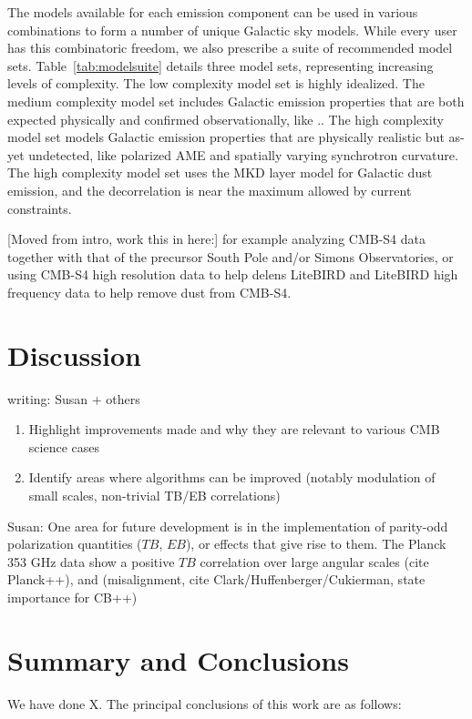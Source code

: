 \documentclass[twocolumn]{aastex631}
\begin{document}
The models available for each emission component can be used in various combinations to form a number of unique Galactic sky models. While every user has this combinatoric freedom, we also prescribe a suite of recommended model sets. Table~\ref{tab:modelsuite} details three model sets, representing increasing levels of complexity. The low complexity model set is highly idealized.
The medium complexity model set includes Galactic emission properties that are both expected physically and confirmed observationally, like ..
The high complexity model set models Galactic emission properties that are physically realistic but as-yet undetected, like polarized AME and spatially varying synchrotron curvature. The high complexity model set uses the MKD layer model for Galactic dust emission, and the decorrelation is near the maximum allowed by current constraints.

[Moved from intro, work this in here:]
for example analyzing CMB-S4 data together with that of the precursor South Pole and/or Simons Observatories, or using CMB-S4 high resolution data to help delens LiteBIRD and LiteBIRD high frequency data to help remove dust from CMB-S4.


\section{Discussion} \label{sec:discussion}
writing: Susan + others

\begin{enumerate}
    \item Highlight improvements made and why they are relevant to various CMB science cases
    \item Identify areas where algorithms can be improved (notably modulation of small scales, non-trivial TB/EB correlations)
\end{enumerate}

Susan:
One area for future development is in the implementation of parity-odd polarization quantities ($TB$, $EB$), or effects that give rise to them. The Planck 353 GHz data show a positive $TB$ correlation over large angular scales (cite Planck++), and (misalignment, cite Clark/Huffenberger/Cukierman, state importance for CB++)


\section{Summary and Conclusions} \label{sec:summary}

We have done X. The principal conclusions of this work are as follows:
\end{document}
